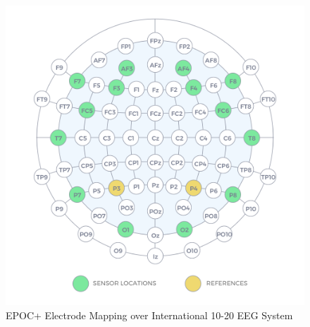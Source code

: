 \documentclass{article}
\begin{document}
\begin{figure}[tbp]
    \centering
    \includegraphics[scale = 0.25]{Images/epoc-20-10.jpg}
    \caption{EPOC+ Electrode Mapping over International 10-20 EEG System}
    \label{fig:Electrode Mapping}
\end{figure}
\end{document}
